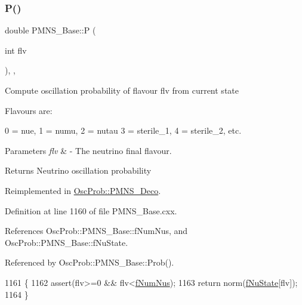 \subsubsection{\texorpdfstring{P()}{P()}}
{\footnotesize\ttfamily double P\+M\+N\+S\+\_\+\+Base\+::P (\begin{DoxyParamCaption}\item[{int}]{flv }\end{DoxyParamCaption})\hspace{0.3cm}{\ttfamily [protected]}, {\ttfamily [virtual]}, {\ttfamily [inherited]}}

Compute oscillation probability of flavour flv from current state

Flavours are\+: 
\begin{DoxyPre}
  0 = nue, 1 = numu, 2 = nutau
  3 = sterile\_1, 4 = sterile\_2, etc.
\end{DoxyPre}
 
\begin{DoxyParams}{Parameters}
{\em flv} & -\/ The neutrino final flavour.\\
\hline
\end{DoxyParams}
\begin{DoxyReturn}{Returns}
Neutrino oscillation probability 
\end{DoxyReturn}


Reimplemented in \hyperlink{classOscProb_1_1PMNS__Deco_aa81f47ea36207b90a5feb9849060032d}{Osc\+Prob\+::\+P\+M\+N\+S\+\_\+\+Deco}.



Definition at line 1160 of file P\+M\+N\+S\+\_\+\+Base.\+cxx.



References Osc\+Prob\+::\+P\+M\+N\+S\+\_\+\+Base\+::f\+Num\+Nus, and Osc\+Prob\+::\+P\+M\+N\+S\+\_\+\+Base\+::f\+Nu\+State.



Referenced by Osc\+Prob\+::\+P\+M\+N\+S\+\_\+\+Base\+::\+Prob().


\begin{DoxyCode}
1161 \{
1162   assert(flv>=0 && flv<\hyperlink{classOscProb_1_1PMNS__Base_a24bb74bed63569dfe88b18fa6a08060e}{fNumNus});
1163   \textcolor{keywordflow}{return} norm(\hyperlink{classOscProb_1_1PMNS__Base_abf99f2339e3ee989600740b5d88063e8}{fNuState}[flv]);
1164 \}
\end{DoxyCode}
\mbox{\label{classOscProb_1_1PMNS__Base_aa2e10704d2d205a1ec8988de14b1a66f}} 
